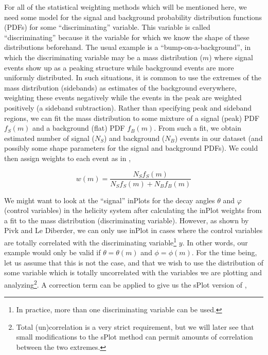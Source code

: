 For all of the statistical weighting methods which will be mentioned here, we need some model for the signal and background probability distribution functions (PDFs) for some ``discriminating'' variable. This variable is called ``discriminating'' because it the variable for which we know the shape of these distributions beforehand. The usual example is a ``bump-on-a-background'', in which the discriminating variable may be a mass distribution ($m$) where signal events show up as a peaking structure while background events are more uniformly distributed. In such situations, it is common to use the extremes of the mass distribution (sidebands) as estimates of the background everywhere, weighting these events negatively while the events in the peak are weighted positively (a sideband subtraction). Rather than specifying peak and sideband regions, we can fit the mass distribution to some mixture of a signal (peak) PDF $f_S(m)$ and a background (flat) PDF $f_B(m)$. From such a fit, we obtain estimated number of signal ($N_S$) and background ($N_B$) events in our dataset (and possibly some shape parameters for the signal and background PDFs). We could then assign weights to each event as in ,

\begin{equation}
  w(m) = \frac{N_S f_S(m)}{N_S f_S(m) + N_B f_B(m)}
  \label{eq:inplot-weights-mass}
\end{equation}

We might want to look at the ``signal'' inPlots for the decay angles $\theta$ and $\varphi$ (control variables) in the helicity system after calculating the inPlot weights from a fit to the mass distribution (discriminating variable). However, as shown by Pivk and Le Diberder\cite{pivk_splot_2005}, we can only use inPlot in cases where the control variables are totally correlated with the discriminating variable\footnote{In practice, more than one discriminating variable can be used.} $y$. In other words, our example would only be valid if $\theta = \theta(m)$ and $\phi = \phi(m)$. For the time being, let us assume that this is not the case, and that we wish to use the distribution of some variable which is totally uncorrelated with the variables we are plotting and analyzing\footnote{Total (un)correlation is a very strict requirement, but we will later see that small modifications to the sPlot method can permit amounts of correlation between the two extremes.}. A correction term can be applied to give us the sPlot version of ,

